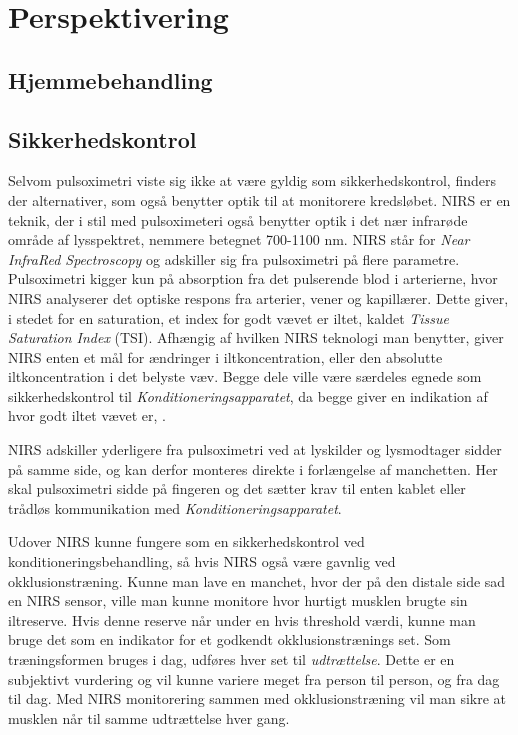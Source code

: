 \chapter{Perspektivering} 

\section{Hjemmebehandling}



\section{Sikkerhedskontrol}\label{title:nirs}
Selvom pulsoximetri viste sig ikke at være gyldig som sikkerhedskontrol, finders der alternativer, som også benytter optik til at monitorere kredsløbet. NIRS er en teknik, der i stil med pulsoximeteri også benytter optik i det nær infrarøde område af lysspektret, nemmere betegnet 700-1100 nm. NIRS står for \textit{Near InfraRed Spectroscopy} og adskiller sig fra pulsoximetri på flere parametre. Pulsoximetri kigger kun på absorption fra det pulserende blod i arterierne, hvor NIRS analyserer det optiske respons fra arterier, vener og kapillærer. Dette giver, i stedet for en saturation, et index for godt vævet er iltet, kaldet \textit{Tissue Saturation Index} (TSI). Afhængig af hvilken NIRS teknologi man benytter, giver NIRS enten et mål for ændringer i iltkoncentration, eller den absolutte iltkoncentration i det belyste væv. Begge dele ville være særdeles egnede som sikkerhedskontrol til \textit{Konditioneringsapparatet}, da begge giver en indikation af hvor godt iltet vævet er, \cite{RefWorks:22} .

NIRS adskiller yderligere fra pulsoximetri ved at lyskilder og lysmodtager sidder på samme side, og kan derfor monteres direkte i forlængelse af manchetten. Her skal pulsoximetri sidde på fingeren og det sætter krav til enten kablet eller trådløs kommunikation med \textit{Konditioneringsapparatet}. 

Udover NIRS kunne fungere som en sikkerhedskontrol ved konditioneringsbehandling, så hvis NIRS også være gavnlig ved okklusionstræning. Kunne man lave en manchet, hvor der på den distale side sad en NIRS sensor, ville man kunne monitore hvor hurtigt musklen brugte sin iltreserve. Hvis denne reserve når under en hvis threshold værdi, kunne man bruge det som en indikator for et godkendt okklusionstrænings set. Som træningsformen bruges i dag, udføres hver set til \textit{udtrættelse}. Dette er en subjektivt vurdering og vil kunne variere meget fra person til person, og fra dag til dag. Med NIRS monitorering sammen med okklusionstræning vil man sikre at musklen når til samme udtrættelse hver gang. 

